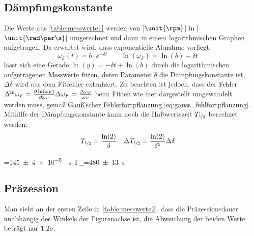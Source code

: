 \subsection{Dämpfungskonstante}
Die Werte aus \cref{table:messwerte1} werden von [\(\unit{\rpm}\)] in [\(\unit{\rad\per\s}\)] umgerechnet und dann in einem logarithmischen Graphen aufgetragen. Da erwartet wird, dass exponentielle Abnahme vorliegt:
\begin{equation}
    \omega_F(t)=b\cdot e^{-\delta t}\qquad \ln(\omega_F)=\ln(b)-\delta t
    \label{eq:Dämpfung}
\end{equation}
lässt sich eine Gerade \(\ln(y)=-\delta t+\ln(b)\) durch die logarithmischen aufgetragenen Messwerte fitten, deren Parameter \(\delta\) die Dämpfungskonstante ist, \(\Delta \delta\) wird aus dem Fitfehler extrahiert. Zu beachten ist jedoch, dass der Fehler \(\Delta^{\mathrm{ln}} \omega_F = \frac{\partial \ln(\omega_F)}{\partial \omega_F}\Delta \omega_F=\frac{\Delta\omega_F}{\omega_F}\) beim Fitten wie hier dargestellt umgewandelt werden muss, gemäß \hyperref[eq:gauss_fehlfortpflanzung]{Gauß'scher Fehlerfortpflanzung \ref{eq:gauss_fehlfortpflanzung}}.
Mithilfe der Dämpfungskonstante kann noch die Halbwertszeit \(T_{\nicefrac{1}{2}}\) berechnet werden:
\begin{align}
    T_{\nicefrac{1}{2}}=\frac{\ln(2)}{\delta}&&\Delta T_{\nicefrac{1}{2}}=\frac{\ln(2)}{\delta^2}\Delta\delta
\end{align}
\begin{rb}
    \delta=\qty{145(4)e-5}{\per\s} \qquad T_{}=\qty{480(13)}{\s}
\end{rb}    

\subsection{Präzession}
Man sieht an der ersten Zeile in \cref{table:messwerte2}, dass die Präzessionsdauer unabhängig des Winkels der Figurenachse ist, die Abweichung der beiden Werte beträgt nur \(\num{1.2}\sigma\). 

